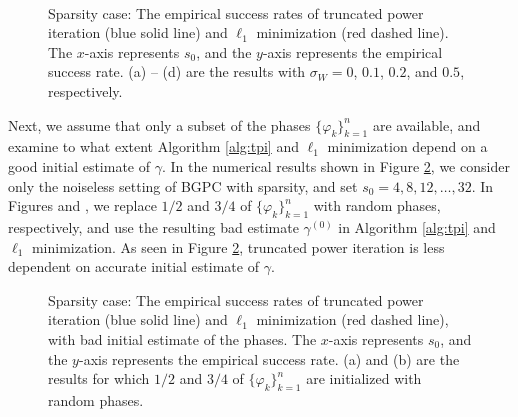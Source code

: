 \documentclass[11pt,journal]{IEEEtran}
\begin{document}
\begin{figure}[htbp]%
\centering
\subfloat[]{
\label{fig:sparsity_a}}
\subfloat[]{
\label{fig:sparsity_b}}
\\
\subfloat[]{
\label{fig:sparsity_c}}
\subfloat[]{
\label{fig:sparsity_d}}
\caption{Sparsity case: The empirical success rates of truncated power iteration (blue solid line) and $\ell_1$ minimization (red dashed line). The $x$-axis represents $s_0$, and the $y$-axis represents the empirical success rate. (a) -- (d) are the results with $\sigma_W=0$, $0.1$, $0.2$, and $0.5$, respectively.}%
\label{fig:sparsity}%
\end{figure}


Next, we assume that only a subset of the phases $\{\varphi_k\}_{k=1}^n$ are available, and examine to what extent Algorithm \ref{alg:tpi} and $\ell_1$ minimization depend on a good initial estimate of $\gamma$. In the numerical results shown in Figure \ref{fig:wrong_phase}, we consider only the noiseless setting of BGPC with sparsity, and set $s_0 = 4, 8, 12, \dots, 32$. In Figures  and , we replace $1/2$ and $3/4$ of $\{\varphi_k\}_{k=1}^n$ with random phases, respectively, and use the resulting bad estimate $\gamma^{(0)}$ in Algorithm \ref{alg:tpi} and $\ell_1$ minimization. As seen in Figure \ref{fig:wrong_phase}, truncated power iteration is less dependent on accurate initial estimate of $\gamma$.


\begin{figure}[htbp]%
\centering
\subfloat[]{
\label{fig:wp_a}}
\subfloat[]{
\label{fig:wp_b}}
\caption{Sparsity case: The empirical success rates of truncated power iteration (blue solid line) and $\ell_1$ minimization (red dashed line), with bad initial estimate of the phases. The $x$-axis represents $s_0$, and the $y$-axis represents the empirical success rate. (a) and (b) are the results for which $1/2$ and $3/4$ of $\{\varphi_k\}_{k=1}^n$ are initialized with random phases.}%
\label{fig:wrong_phase}%
\end{figure}
\end{document}
